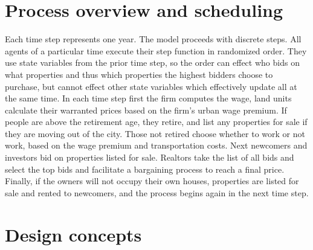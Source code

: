 


\section{Process overview and scheduling}

Each time step represents one year. The model proceeds with discrete steps. All agents of a particular time execute their step function in randomized order. They use state variables from the prior time step, so the order can effect who bids on what properties and thus which properties the highest bidders choose to purchase, but cannot effect other state variables which effectively update all at the same time. %
In each time step first the firm computes the wage, land units calculate their warranted prices based on the firm's urban wage premium. If people are above the retirement age, they retire, and list any properties for sale if they are moving out of the city. Those not retired choose whether to work or not work, based on the wage premium and transportation costs. Next newcomers and investors bid on properties listed for sale. Realtors take the list of all bids and select the top bids and facilitate a bargaining process to reach a final price. Finally, if the owners will not occupy their own houses, properties are listed for sale and rented to newcomers, and the process begins again in the next time step. 



\section{Design concepts}




